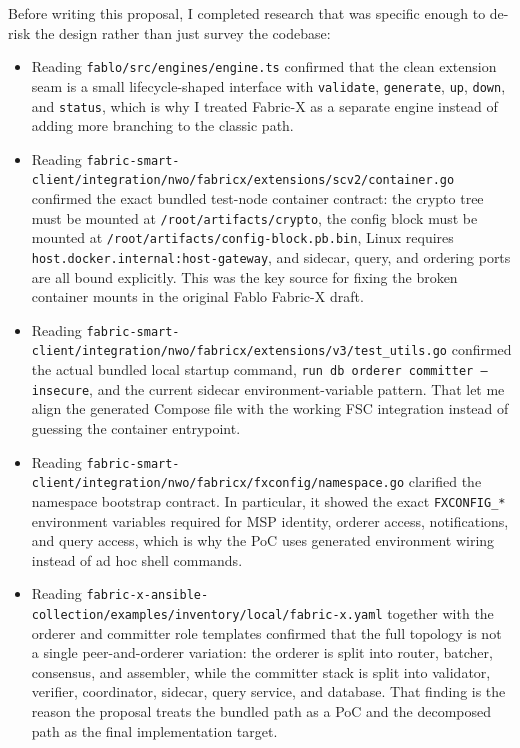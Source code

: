 \begin{tcolorbox}[colback=green!5!white, colframe=green!60!black,
  title=Pre-Application Research Completed, fonttitle=\bfseries, arc=4pt]
Before writing this proposal, I completed research that was specific enough to de-risk the design rather than just survey the codebase:
\begin{itemize}[leftmargin=*]
  \item Reading \texttt{fablo/src/engines/engine.ts} confirmed that the clean extension seam is a small lifecycle-shaped interface with \texttt{validate}, \texttt{generate}, \texttt{up}, \texttt{down}, and \texttt{status}, which is why I treated Fabric-X as a separate engine instead of adding more branching to the classic path.
  \item Reading \texttt{fabric-smart-client/integration/nwo/fabricx/extensions/scv2/container.go} confirmed the exact bundled test-node container contract: the crypto tree must be mounted at \texttt{/root/artifacts/crypto}, the config block must be mounted at \texttt{/root/artifacts/config-block.pb.bin}, Linux requires \texttt{host.docker.internal:host-gateway}, and sidecar, query, and ordering ports are all bound explicitly. This was the key source for fixing the broken container mounts in the original Fablo Fabric-X draft.
  \item Reading \texttt{fabric-smart-client/integration/nwo/fabricx/extensions/v3/test\_utils.go} confirmed the actual bundled local startup command, \texttt{run db orderer committer --insecure}, and the current sidecar environment-variable pattern. That let me align the generated Compose file with the working FSC integration instead of guessing the container entrypoint.
  \item Reading \texttt{fabric-smart-client/integration/nwo/fabricx/fxconfig/namespace.go} clarified the namespace bootstrap contract. In particular, it showed the exact \texttt{FXCONFIG\_*} environment variables required for MSP identity, orderer access, notifications, and query access, which is why the PoC uses generated environment wiring instead of ad hoc shell commands.
  \item Reading \texttt{fabric-x-ansible-collection/examples/inventory/local/fabric-x.yaml} together with the orderer and committer role templates confirmed that the full topology is not a single peer-and-orderer variation: the orderer is split into router, batcher, consensus, and assembler, while the committer stack is split into validator, verifier, coordinator, sidecar, query service, and database. That finding is the reason the proposal treats the bundled path as a PoC and the decomposed path as the final implementation target.

\end{itemize}
\end{tcolorbox}
